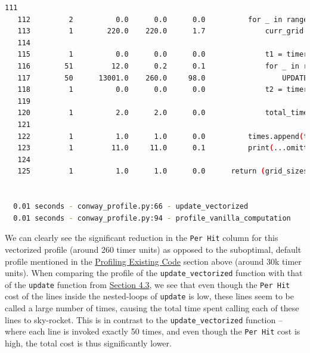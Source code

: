 \documentclass[a4paper,12pt]{article}
\begin{document}
\begin{lstlisting}[language=bash,basicstyle=\tiny\ttfamily]
   111                                                                                                                                           
   112         2          0.0      0.0      0.0          for _ in range(num_runs):                                                               
   113         1        220.0    220.0      1.7              curr_grid = random_grid(curr_size)                                                  
   114                                                                                                                                           
   115         1          0.0      0.0      0.0              t1 = timer()                                                                        
   116        51         12.0      0.2      0.1              for _ in range(max_iters):                                                          
   117        50      13001.0    260.0     98.0                  UPDATE_DICT[update_method_key](curr_grid, curr_size)                            
   118         1          0.0      0.0      0.0              t2 = timer()                                                                        
   119                                                                                                                                           
   120         1          2.0      2.0      0.0              total_time += (t2 - t1)                                                             
   121                                                                                                                                           
   122         1          1.0      1.0      0.0          times.append(total_time / num_runs)                                                     
   123         1         11.0     11.0      0.1          print(...omitted for space...)                 
   124                                                                                                                                           
   125         1          1.0      1.0      0.0      return (grid_sizes, times)                                                                  


  0.01 seconds - conway_profile.py:66 - update_vectorized
  0.01 seconds - conway_profile.py:94 - profile_vanilla_computation
  \end{lstlisting}
  We can clearly see the significant reduction in the \verb|Per Hit| column for this vectorized profile (around 260 timer units) as opposed to the suboptimal, default profile mentioned in the \hyperref[sec:b3]{Profiling Existing Code} section above (around 30k timer units). When comparing the profile of the \verb|update_vectorized| function with that of the \verb|update| function from \hyperref[sec:b3]{Section 4.3}, we see that even though the \verb|Per Hit| cost of the lines inside the nested-loops of \verb|update| is low, these lines seem to be called a large number of times, causing the total time spent calling each of these lines to sky-rocket. This is in contrast to the \verb|update_vectorized| function -- where each line is invoked exactly 50 times, and even though the \verb|Per Hit| cost is high, the total cost is thus significantly lower. 
\end{document}
